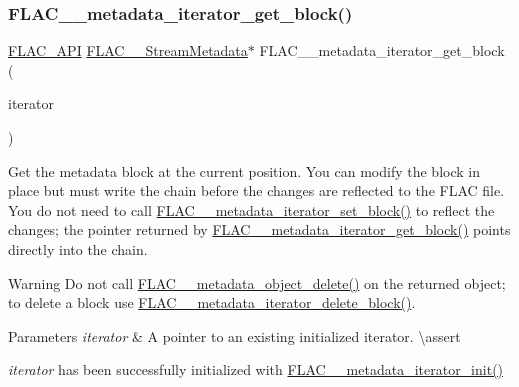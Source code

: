 \subsubsection{\texorpdfstring{FLAC\_\_metadata\_iterator\_get\_block()}{FLAC\_\_metadata\_iterator\_get\_block()}}
{\footnotesize\ttfamily \mbox{\hyperlink{group__flac__export_ga56ca07df8a23310707732b1c0007d6f5}{F\+L\+A\+C\+\_\+\+A\+PI}} \mbox{\hyperlink{struct_f_l_a_c_____stream_metadata}{F\+L\+A\+C\+\_\+\+\_\+\+Stream\+Metadata}}$\ast$ F\+L\+A\+C\+\_\+\+\_\+metadata\+\_\+iterator\+\_\+get\+\_\+block (\begin{DoxyParamCaption}\item[{\mbox{\hyperlink{group__flac__metadata__level2_ga9f3e135a07cdef7e51597646aa7b89b2}{F\+L\+A\+C\+\_\+\+\_\+\+Metadata\+\_\+\+Iterator}} $\ast$}]{iterator }\end{DoxyParamCaption})}

Get the metadata block at the current position. You can modify the block in place but must write the chain before the changes are reflected to the F\+L\+AC file. You do not need to call \mbox{\hyperlink{group__flac__metadata__level2_gab40c33a0bf35a2932a5c13f5230e0d9e}{F\+L\+A\+C\+\_\+\+\_\+metadata\+\_\+iterator\+\_\+set\+\_\+block()}} to reflect the changes; the pointer returned by \mbox{\hyperlink{group__flac__metadata__level2_ga4a2b00a4312d178a9f55c2e2f8b08904}{F\+L\+A\+C\+\_\+\+\_\+metadata\+\_\+iterator\+\_\+get\+\_\+block()}} points directly into the chain.

\begin{DoxyWarning}{Warning}
Do not call \mbox{\hyperlink{group__flac__metadata__object_ga66bbe27dba68ba77be5af83986a280ea}{F\+L\+A\+C\+\_\+\+\_\+metadata\+\_\+object\+\_\+delete()}} on the returned object; to delete a block use \mbox{\hyperlink{group__flac__metadata__level2_ga18fdaae4986696dc000cae6357810f7b}{F\+L\+A\+C\+\_\+\+\_\+metadata\+\_\+iterator\+\_\+delete\+\_\+block()}}.
\end{DoxyWarning}

\begin{DoxyParams}{Parameters}
{\em iterator} & A pointer to an existing initialized iterator. \textbackslash{}assert 
\begin{DoxyCode}{1}
\end{DoxyCode}
 {\itshape iterator} has been successfully initialized with \mbox{\hyperlink{group__flac__metadata__level2_ga4a5af69a1f19436b02f738eb8c97c959}{F\+L\+A\+C\+\_\+\+\_\+metadata\+\_\+iterator\+\_\+init()}} \\
\hline
\end{DoxyParams}

